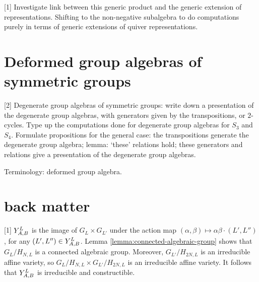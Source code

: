 \documentclass[a4paper, 11pt]{report}
\begin{document}
[1] Investigate link between this generic product and the generic extension of representations. Shifting to the non-negative subalgebra to do computations purely in terms of generic extensions of quiver representations.

\section{Deformed group algebras of symmetric groups}

[2] Degenerate group algebras of symmetric groups: write down a presentation of the degenerate group algebras, with generators given by the transpositions, or $2$-cycles. Type up the computations done for degenerate group algebras for $S_3$ and $S_4$. Formulate propositions for the general case: the transpositions generate the degenerate group algebra; lemma: `these' relations hold; these generators and relations give a presentation of the degenerate group algebras.

Terminology: deformed group algebra.

\section{back matter}

[1] $\yprod[L]{A,B}$ is the image of $G_L\times G_{L'}$ under the action map $(\alpha,\beta)\mapsto \alpha\beta\cdot(L',L'')$, for any $(L',L'')\in\yprod[L]{A,B}$. Lemma \ref{lemma:connected-algebraic-group} shows that $G_L/{H_{N,L}}$ is a connected algebraic group. Moreover, $G_{L'}/{H_{2N,L}}$ is an irreducible affine variety, so $G_{L}/{H_{N,L}}\times G_{L'}/{H_{2N,L}}$ is an irreducible affine variety. It follows that $\yprod[L]{A,B}$ is irreducible and constructible.


\nocite{*}
\printbibliography
\end{document}
